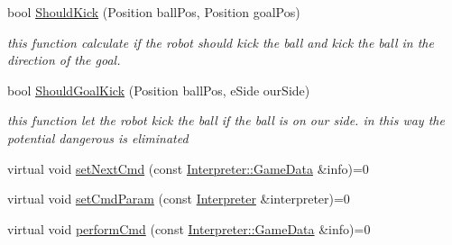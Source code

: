 \begin{DoxyCompactItemize}
\item 
bool \hyperlink{classTeamRobot_ac979572f4899940e88f067102ac1ae46}{ShouldKick} (Position ballPos, Position goalPos)
\begin{DoxyCompactList}\small\item\em this function calculate if the robot should kick the ball and kick the ball in the direction of the goal. \item\end{DoxyCompactList}\item 
bool \hyperlink{classTeamRobot_ae7f6fa303c865dad297b662731165883}{ShouldGoalKick} (Position ballPos, eSide ourSide)
\begin{DoxyCompactList}\small\item\em this function let the robot kick the ball if the ball is on our side. in this way the potential dangerous is eliminated \item\end{DoxyCompactList}\item 
virtual void \hyperlink{classTeamRobot_a65f9a2b7464dfac3f4a0336810cf574f}{setNextCmd} (const \hyperlink{structInterpreter_1_1GameData}{Interpreter::GameData} \&info)=0
\item 
virtual void \hyperlink{classTeamRobot_a34c0fd6986c510d4025e5752b3c0e49a}{setCmdParam} (const \hyperlink{classInterpreter}{Interpreter} \&interpreter)=0
\item 
virtual void \hyperlink{classTeamRobot_a9b84df51ca16a7203fdb6498ea6741da}{performCmd} (const \hyperlink{structInterpreter_1_1GameData}{Interpreter::GameData} \&info)=0
\end{DoxyCompactItemize}
